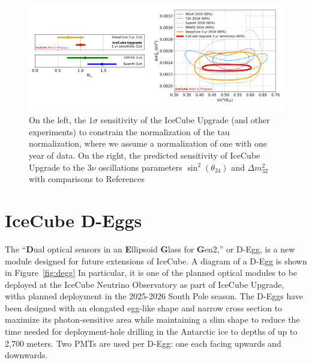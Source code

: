\documentclass[main.tex]{subfiles}
\begin{document}
\begin{figure}
    \centering
    \includegraphics[width=0.85\linewidth]{figures/upgrade_physics.png}
    \caption{On the left, the $1\sigma$ sensitivity of the IceCube Upgrade (and other experiments) to constrain the normalization of the tau normalization, where we assume a normalization of one with one year of data. On the right, the predicted sensitivity of IceCube Upgrade to the 3$\nu$ oscillations parameters $\sin^{2}(\theta_{24})$ and $\Delta m_{32}^{2}$ with comparisons to References~\cite{PhysRevLett.120.071801, PhysRevD.98.052006, PhysRevLett.120.211801, WHITEHEAD2016130,Haegel_2017}}
\end{figure}


\section{IceCube D-Eggs}

The ``\textbf{D}ual optical sensors in an \textbf{E}llipsoid \textbf{G}lass for \textbf{G}en2,'' or D-Egg, is a new module designed for future extensions of IceCube. 
A diagram of a D-Egg is shown in Figure~\ref{fig:degg}
In particular, it is one of the planned optical modules to be deployed at the IceCube Neutrino Observatory as part of IceCube Upgrade, witha planned deployment in the 2025-2026 South Pole season.
The D-Eggs have been designed with an elongated egg-like shape and narrow cross section to maximize its photon-sensitive area while maintaining a slim shape to reduce the time needed for deployment-hole drilling in the Antarctic ice to depths of up to 2,700 meters. 
Two PMTs are used per D-Egg: one each facing upwards and downwards. 
\end{document}
